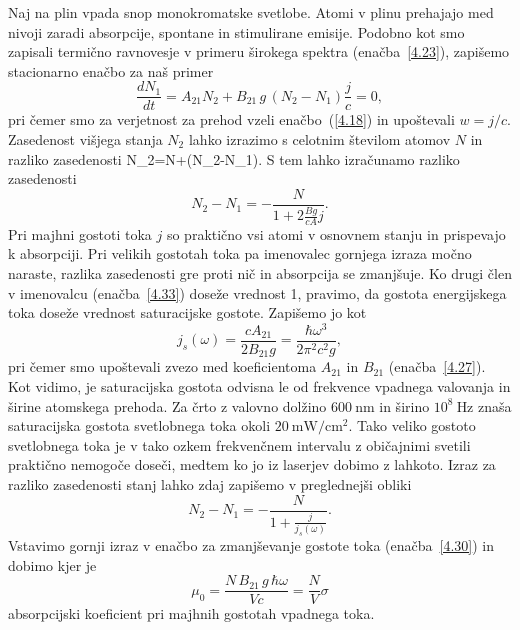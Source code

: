 Naj na plin vpada snop monokromatske svetlobe. 
Atomi v plinu prehajajo med nivoji zaradi absorpcije, spontane in stimulirane emisije. 
Podobno kot smo zapisali termično ravnovesje v primeru
širokega spektra (enačba~\ref{4.23}), zapišemo stacionarno enačbo za naš 
primer
\begin{equation}
\frac{dN_{1}}{dt}=A_{21}N_{2}+B_{21}\,g\,(N_{2}-N_{1})\frac{j}{c}=
0,
\label{4.32}
\end{equation}
pri čemer smo za verjetnost za prehod vzeli
enačbo~(\ref{4.18}) in upoštevali $w=j/c$. Zasedenost višjega stanja $N_{2}$ lahko izrazimo s 
celotnim številom atomov $N$ in razliko zasedenosti 
\beq
N_{2}=N+(N_{2}-N_{1}).
\label{4.321}
\eeq
S tem lahko izračunamo razliko zasedenosti 
\begin{equation}
N_{2}-N_{1}=-\frac{N}{1+2\frac{Bg}{cA}j}.
\label{4.33}
\end{equation}
Pri majhni gostoti toka $j$ so praktično vsi atomi v osnovnem stanju in prispevajo
k absorpciji. Pri velikih gostotah toka pa imenovalec gornjega
izraza močno naraste, razlika zasedenosti gre proti nič in absorpcija se zmanjšuje.
Ko drugi člen v imenovalcu (enačba~\ref{4.33}) doseže vrednost 1, pravimo, da
gostota energijskega toka doseže vrednost saturacijske gostote.
Zapišemo jo kot 
\begin{equation}
j_{s}(\omega)=\frac{cA_{21}}{2B_{21}g}=
\frac{\hbar\omega^{3}}{2\pi^{2}c^{2}g},
\label{4.34}
\end{equation}
pri čemer smo upoštevali zvezo med koeficientoma $A_{21}$ in $B_{21}$
(enačba~\ref{4.27}).
Kot vidimo, je saturacijska gostota odvisna le od frekvence vpadnega valovanja 
in širine atomskega prehoda. Za črto z valovno dolžino $600~\si{\nano\metre}$ 
in širino $10^{8}~\si{\hertz}$ znaša saturacijska gostota svetlobnega toka okoli 
$20~\si{\milli\watt/\centi\metre^2}$. Tako veliko gostoto svetlobnega toka je v tako ozkem
frekvenčnem intervalu z običajnimi svetili praktično nemogoče doseči, 
medtem ko jo iz laserjev dobimo z lahkoto.
Izraz za razliko zasedenosti stanj lahko zdaj zapišemo v preglednejši obliki
\begin{equation}
N_{2}-N_{1}=-\frac{N}{1+\frac{j}{j_{s}(\omega)}}.
\label{4.35}
\end{equation}
Vstavimo gornji izraz v enačbo za zmanjševanje gostote toka (enačba~\ref{4.30}) in 
dobimo 
kjer je 
\begin{equation}
\mu_{0}=\frac{N\,B_{21}\,g\,\hbar\omega}{Vc} = \frac{N}{V}\sigma
\end{equation}
absorpcijski koeficient pri majhnih gostotah vpadnega toka.

